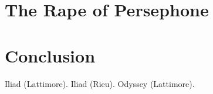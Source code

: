 \documentclass[11pt]{article}
\begin{document}


\section{The Rape of Persephone}


\section{Conclusion}


\newpage

\begin{thebibliography}{9}
		Iliad (Lattimore).
		Iliad (Rieu).
		Odyssey (Lattimore).
\end{thebibliography}
\end{document}
